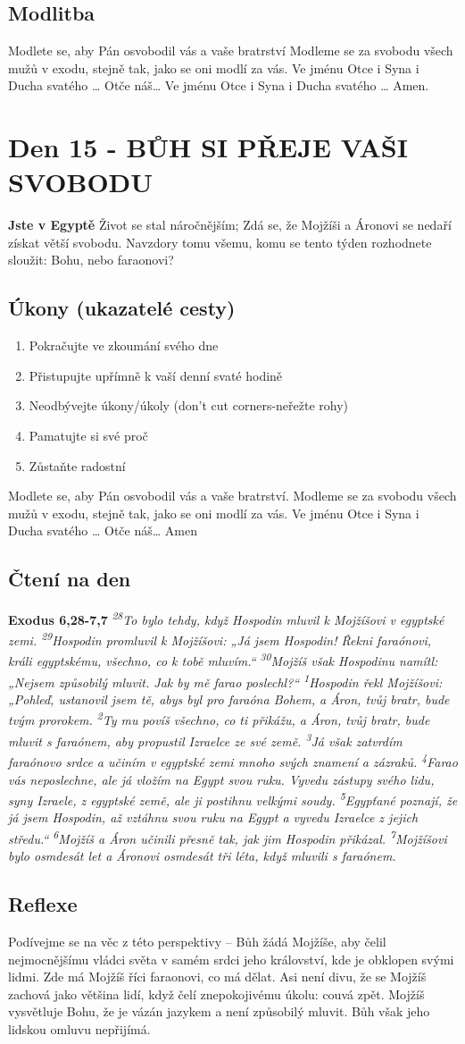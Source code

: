 \documentclass[11pt]{article}
\newcommand{\zacatekTretiTyden}{
  \textbf{Jste v Egyptě} \newline
  Život se stal náročnějším; Zdá se, že Mojžíši a Áronovi se nedaří získat větší svobodu. Navzdory tomu všemu,
komu se tento týden rozhodnete sloužit: Bohu, nebo faraonovi?

\subsection*{Úkony (ukazatelé cesty)}
\begin{enumerate}
  \item Pokračujte ve zkoumání svého dne
  \item Přistupujte upřímně k vaší denní svaté hodině
  \item Neodbývejte úkony/úkoly (don’t cut corners-neřežte rohy)
  \item Pamatujte si své proč
  \item Zůstaňte radostní
\end{enumerate}
Modlete se, aby Pán osvobodil vás a vaše bratrství. \newline
Modleme se za svobodu všech mužů v exodu, stejně tak, jako se oni modlí za vás.\newline
Ve jménu Otce i Syna i Ducha svatého …  Otče náš… Amen
}
\begin{document}
\subsection*{Modlitba}
Modlete se, aby Pán osvobodil vás a vaše bratrství \newline
Modleme se za svobodu všech mužů v exodu, stejně tak, jako se oni modlí za vás.\newline
Ve jménu Otce i Syna i Ducha svatého … Otče náš… Ve jménu Otce i Syna i Ducha svatého … Amen.

\newpage


\newpage
\section{Den 15 - BŮH SI PŘEJE VAŠI SVOBODU}
\zacatekTretiTyden
\subsection*{Čtení na den}
\textbf{Exodus 6,28-7,7}
\newline
\textit{
\textsuperscript{28}To bylo tehdy, když Hospodin mluvil k Mojžíšovi v egyptské zemi.
\textsuperscript{29}Hospodin promluvil k Mojžíšovi: „Já jsem Hospodin! Řekni faraónovi, králi egyptskému, všechno, co k tobě mluvím.“
\textsuperscript{30}Mojžíš však Hospodinu namítl: „Nejsem způsobilý mluvit. Jak by mě farao poslechl?“
\textsuperscript{1}Hospodin řekl Mojžíšovi: „Pohleď, ustanovil jsem tě, abys byl pro faraóna Bohem, a Áron, tvůj bratr, bude tvým prorokem.
\textsuperscript{2}Ty mu povíš všechno, co ti přikážu, a Áron, tvůj bratr, bude mluvit s faraónem, aby propustil Izraelce ze své země.
\textsuperscript{3}Já však zatvrdím faraónovo srdce a učiním v egyptské zemi mnoho svých znamení a zázraků.
\textsuperscript{4}Farao vás neposlechne, ale já vložím na Egypt svou ruku. Vyvedu zástupy svého lidu, syny Izraele, z egyptské země, ale ji postihnu velkými soudy.
\textsuperscript{5}Egypťané poznají, že já jsem Hospodin, až vztáhnu svou ruku na Egypt a vyvedu Izraelce z jejich středu.“
\textsuperscript{6}Mojžíš a Áron učinili přesně tak, jak jim Hospodin přikázal.
\textsuperscript{7}Mojžíšovi bylo osmdesát let a Áronovi osmdesát tři léta, když mluvili s faraónem.
}

\subsection*{Reflexe}
Podívejme se na věc z této perspektivy – Bůh žádá Mojžíše, aby čelil nejmocnějšímu vládci světa v samém srdci
jeho království, kde je obklopen svými lidmi. Zde má Mojžíš říci faraonovi, co má dělat. Asi není divu, že se
Mojžíš zachová jako většina lidí, když čelí znepokojivému úkolu: couvá zpět. Mojžíš vysvětluje Bohu, že je vázán
jazykem a není způsobilý mluvit. Bůh však jeho lidskou omluvu nepřijímá.
\end{document}
